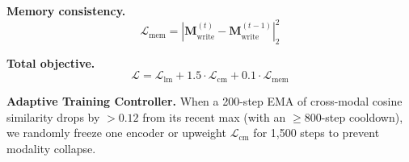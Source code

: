 
\textbf{Memory consistency.}
\begin{equation}
\mathcal{L}_{\text{mem}} = | \mathbf{M}^{(t)}_{\text{write}} - \mathbf{M}^{(t-1)}_{\text{write}} |_2^2
\label{eq:memory_consistent}
\end{equation}

\textbf{Total objective.}
\begin{equation}
\mathcal{L} = \mathcal{L}_{\text{lm}} + 1.5 · \mathcal{L}_{\text{cm}} + 0.1 · \mathcal{L}_{\text{mem}}
\label{eq:total_obj}
\end{equation}





\textbf{Adaptive Training Controller.} When a 200-step EMA of cross-modal cosine similarity drops by $>0.12$ from its recent max (with an $\geq$800-step cooldown), we randomly freeze one encoder or upweight $\mathcal{L}_{\text{cm}}$ for 1,500 steps to prevent modality collapse.











